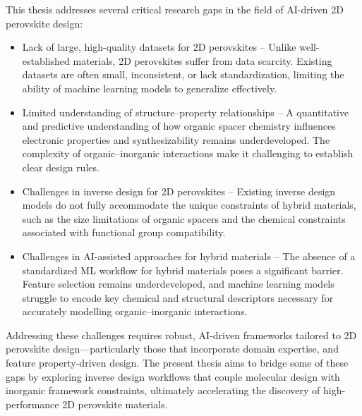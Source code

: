 This thesis addresses several critical research gaps in the field of AI-driven 2D perovskite design:

\begin{itemize}
    \item Lack of large, high-quality datasets for 2D perovskites – Unlike well-established materials, 2D perovskites suffer from data scarcity. Existing datasets are often small, inconsistent, or lack standardization, limiting the ability of machine learning models to generalize effectively.
    \item Limited understanding of structure–property relationships – A quantitative and predictive understanding of how organic spacer chemistry influences electronic properties and synthesizability remains underdeveloped. The complexity of organic–inorganic interactions make it challenging to establish clear design rules.
    \item Challenges in inverse design for 2D perovskites – Existing inverse design models do not fully accommodate the unique constraints of hybrid materials, such as the size limitations of organic spacers and the chemical constraints associated with functional group compatibility.
    \item Challenges in AI-assisted approaches for hybrid materials – The absence of a standardized ML workflow for hybrid materials poses a significant barrier. Feature selection remains underdeveloped, and machine learning models struggle to encode key chemical and structural descriptors necessary for accurately modelling organic–inorganic interactions.
\end{itemize}

Addressing these challenges requires robust, AI-driven frameworks tailored to 2D perovskite design—particularly those that incorporate domain expertise, and feature property-driven design. The present thesis aims to bridge some of these gaps by exploring inverse design workflows that couple molecular design with inorganic framework constraints, ultimately accelerating the discovery of high-performance 2D perovskite materials.
